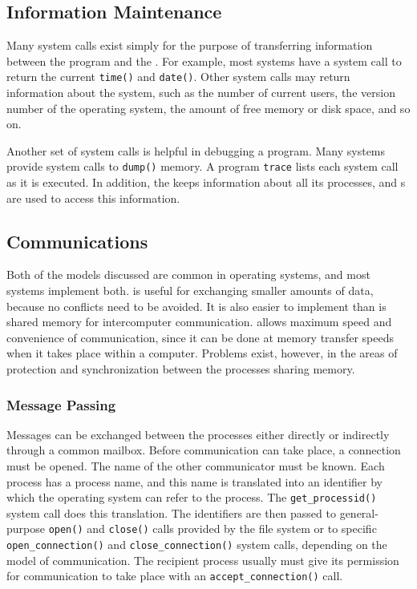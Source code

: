 \subsection{Information Maintenance}\label{subsec:Information_Maintenance}
Many system calls exist simply for the purpose of transferring information between the  program and the .
For example, most systems have a system call to return the current \texttt{time()} and \texttt{date()}.
Other system calls may return information about the system, such as the number of current users, the version number of the operating system, the amount of free memory or disk space, and so on.

Another set of system calls is helpful in debugging a program.
Many systems provide system calls to \texttt{dump()} memory.
A program \texttt{trace} lists each system call as it is executed.
In addition, the  keeps information about all its processes, and s are used to access this information.

\subsection{Communications}\label{subsec:Communications}
Both of the models discussed are common in operating systems, and most systems implement both.
 is useful for exchanging smaller amounts of data, because no conflicts need to be avoided.
It is also easier to implement than is shared memory for intercomputer communication.
 allows maximum speed and convenience of communication, since it can be done at memory transfer speeds when it takes place within a computer.
Problems exist, however, in the areas of protection and synchronization between the processes sharing memory.

\subsubsection{Message Passing}\label{subsubsec:Message_Passing}
Messages can be exchanged between the processes either directly or indirectly through a common mailbox.
Before communication can take place, a connection must be opened.
The name of the other communicator must be known.
Each process has a process name, and this name is translated into an identifier by which the operating system can refer to the process.
The \texttt{get_processid()} system call does this translation.
The identifiers are then passed to general-purpose \texttt{open()} and \texttt{close()} calls provided by the file system or to specific \texttt{open_connection()} and \texttt{close_connection()} system calls, depending on the model of communication.
The recipient process usually must give its permission for communication to take place with an \texttt{accept_connection()} call.

